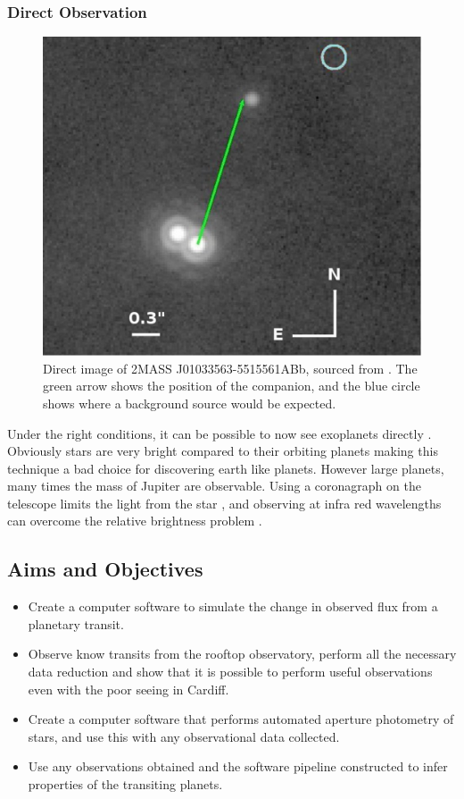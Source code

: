 \subsubsection{Direct Observation}

\begin{figure}[ht]
    \centering
    \includegraphics[width=\figwidth]{images/direct_image.png}
    \caption{Direct image of 2MASS J01033563-5515561ABb, sourced from \cite{delorme2013direct}. The green arrow shows the position of the companion, and the blue circle shows where a background source would be expected.}
    \label{fig:direct}
\end{figure}

Under the right conditions, it can be possible to now see exoplanets directly \citep{lafreniere2010directly,kuzuhara2013direct,delorme2013direct}. Obviously stars are very bright compared to their orbiting planets making this technique a bad choice for discovering earth like planets. However large planets, many times the mass of Jupiter are observable. Using a coronagraph on the telescope limits the light from the star \citep{kuchner2002coronagraph}, and observing at infra red wavelengths can overcome the relative brightness problem \citep{delorme2013direct}.

\subsection{Aims and Objectives}
\begin{itemize}
\item Create a computer software to simulate the change in observed flux from a planetary transit.
\item Observe know transits from the rooftop observatory, perform all the necessary data reduction and show that it is possible to perform useful observations even with the poor seeing in Cardiff.
\item Create a computer software that performs automated aperture photometry of stars, and use this with any observational data collected.
\item Use any observations obtained and the software pipeline constructed to infer properties of the transiting planets.
\end{itemize}